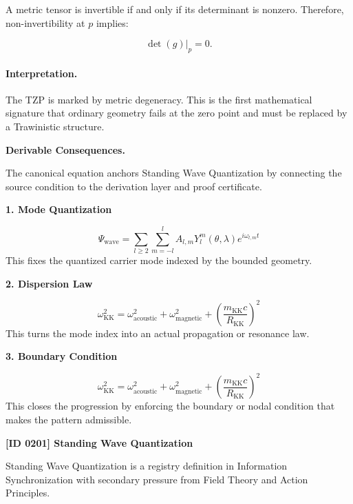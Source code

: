 A metric tensor is invertible if and only if its determinant is nonzero. Therefore, non-invertibility at $p$ implies:

\begin{equation}
\det(g)\big|_{p}=0 .
\end{equation}

\paragraph{Interpretation.}
The TZP is marked by metric degeneracy. This is the first mathematical signature that ordinary geometry fails at the zero point and must be replaced by a Trawinistic structure.

\par\vspace{0.35em}
\noindent\textbf{Derivable Consequences.}\quad
\begingroup
\footnotesize
\raggedright
The canonical equation anchors Standing Wave Quantization by connecting the source condition to the derivation layer and proof certificate.
\par\endgroup

\noindent\textbf{1. Mode Quantization}\par
\[
\Psi_{\mathrm{wave}} = \sum_{l\ge 2}\sum_{m=-l}^{l} A_{l,m}Y_l^m(\theta,\lambda)e^{i\omega_{l,m}t}
\]
\noindent This fixes the quantized carrier mode indexed by the bounded geometry.\par
\noindent\textbf{2. Dispersion Law}\par
\[
\omega_{\mathrm{KK}}^{2} = \omega_{\mathrm{acoustic}}^{2} + \omega_{\mathrm{magnetic}}^{2} + \left(\frac{m_{\mathrm{KK}}c}{R_{\mathrm{KK}}}\right)^{2}
\]
\noindent This turns the mode index into an actual propagation or resonance law.\par
\noindent\textbf{3. Boundary Condition}\par
\[
\omega_{\mathrm{KK}}^{2} = \omega_{\mathrm{acoustic}}^{2} + \omega_{\mathrm{magnetic}}^{2} + \left(\frac{m_{\mathrm{KK}}c}{R_{\mathrm{KK}}}\right)^{2}
\]
\noindent This closes the progression by enforcing the boundary or nodal condition that makes the pattern admissible.\par

\clearpage
\noindent\textbf{[ID 0201] Standing Wave Quantization}\par
\vspace{0.35em}
\begingroup\small
{}
Standing Wave Quantization is a registry definition in Information Synchronization with secondary pressure from Field Theory and Action Principles.

